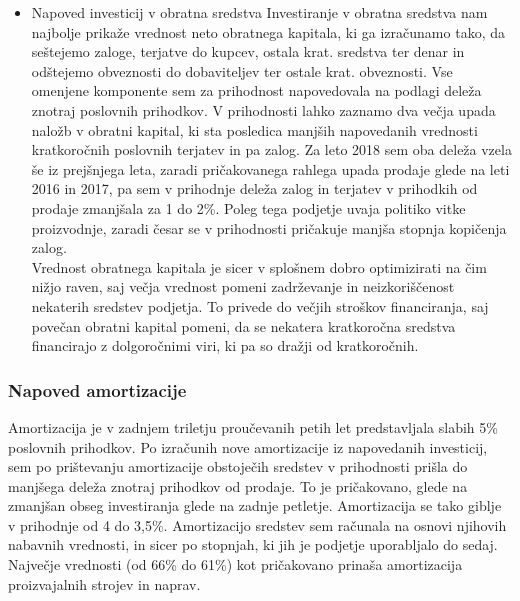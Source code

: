 \documentclass[12pt,a4paper]{amsart}
\theoremstyle{definition} %
\theoremstyle{plain} %
\begin{document}
\begin{itemize}
\item{Napoved investicij v obratna sredstva}
Investiranje v obratna sredstva nam najbolje prikaže vrednost neto obratnega kapitala, ki ga izračunamo tako, da seštejemo zaloge, terjatve do kupcev, ostala krat. sredstva ter denar in odštejemo obveznosti do dobaviteljev ter ostale krat. obveznosti. Vse omenjene komponente sem za prihodnost napovedovala na podlagi deleža znotraj poslovnih prihodkov. V prihodnosti lahko zaznamo dva večja upada naložb v obratni kapital, ki sta posledica manjših napovedanih vrednosti kratkoročnih poslovnih terjatev in pa zalog. Za leto 2018 sem oba deleža vzela še iz prejšnjega leta, zaradi pričakovanega rahlega upada prodaje glede na leti 2016 in 2017, pa sem v prihodnje deleža zalog in terjatev v prihodkih od prodaje zmanjšala za 1 do 2\%. Poleg tega podjetje uvaja politiko vitke proizvodnje, zaradi česar se v prihodnosti pričakuje manjša stopnja kopičenja zalog.\\
Vrednost obratnega kapitala je sicer v splošnem dobro optimizirati na čim nižjo raven, saj večja vrednost pomeni zadrževanje in neizkoriščenost nekaterih sredstev podjetja. To privede do večjih stroškov financiranja, saj povečan obratni kapital pomeni, da se nekatera kratkoročna sredstva financirajo z dolgoročnimi viri, ki pa so dražji od kratkoročnih.
\end{itemize}


\subsubsection{Napoved amortizacije}
Amortizacija je v zadnjem triletju proučevanih petih let predstavljala slabih 5\% poslovnih prihodkov. Po izračunih nove amortizacije iz napovedanih investicij, sem po prištevanju amortizacije obstoječih sredstev v prihodnosti prišla do manjšega deleža znotraj prihodkov od prodaje. To je pričakovano, glede na zmanjšan obseg investiranja glede na zadnje petletje. Amortizacija se tako giblje v prihodnje od 4 do 3,5\%. Amortizacijo sredstev sem računala na osnovi njihovih nabavnih vrednosti, in sicer po stopnjah, ki jih je podjetje uporabljalo do sedaj. Največje vrednosti (od 66\% do 61\%) kot pričakovano prinaša amortizacija proizvajalnih strojev in naprav. 
\end{document}
